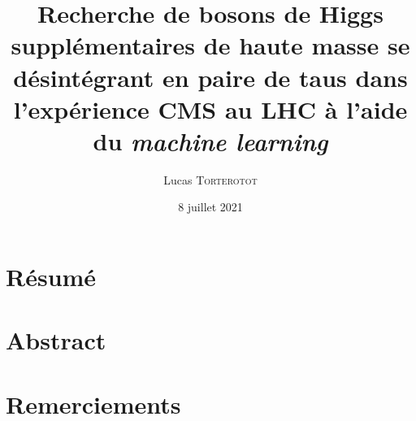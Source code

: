 \RequirePackage[log-declarations=false]{xparse}
\usepackage[none,nabla,seccolor,ppl,nosorting,minitoc]{ltstyle}
\usepackage{cmstransversetikz}



\def\insertlabo{Institut de Physique des 2 Infinis de Lyon}
\def\insertshortlabo{IP2I}

\title{Recherche de bosons de Higgs supplémentaires de haute masse se désintégrant en paire de taus dans l'expérience CMS au LHC à l'aide du \emph{machine learning}}
\author[L. \textsc{Torterotot}]{Lucas \textsc{Torterotot}}
\date{8 juillet 2021}
\imgcover{}
\editionsettings{}
\publisher{}


\pagestyle{empty}

\cleardoublepage
\pagestyle{empty}

\cleardoublepage
\chapter*{Résumé}\thispagestyle{empty}\pagestyle{empty}

\chapter*{Abstract}\thispagestyle{empty}\pagestyle{empty}

\cleardoublepage
\chapter*{Remerciements}\thispagestyle{empty}\pagestyle{empty}

\cleardoublepage
\frontmatter
\tableofcontents
\listoffigures
\listoftables
\mainmatter



\appendix\def\minitoc{}

\backmatter
\printbibliographyREF

